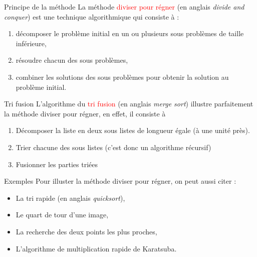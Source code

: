 \documentclass[10pt]{beamer}
\begin{document}
\begin{frame}
	\mframe{\DR}
	\begin{alertblock}{Principe de la méthode}
		La méthode \textcolor{red}{diviser pour régner} (en anglais \textit{divide and conquer})  est une technique algorithmique qui consiste à :        \begin{enumerate}
			\item<2-> décomposer le problème initial en un ou plusieurs sous problèmes de taille inférieure,
			\item<3-> résoudre chacun des sous problèmes,
			\item<4-> combiner les solutions des sous problèmes pour obtenir la solution au problème initial.
		\end{enumerate}
	\end{alertblock}
\end{frame}

\begin{frame}
	\mframe{\DR}
	\begin{alertblock}{Tri fusion}
		L'algorithme du \textcolor{red}{tri fusion} (en anglais \textit{merge sort})  illustre parfaitement la méthode diviser pour régner, en effet, il consiste à
		\begin{enumerate}
			\item<2-> Décomposer la liste en deux sous listes de longueur égale (à une unité près).
			\item<3-> Trier chacune des sous listes (c'est donc un algorithme récursif)
			\item<4-> Fusionner les parties triées
		\end{enumerate}
	\end{alertblock}
\end{frame}


\begin{frame}
	\mframe{\DR}
	\begin{exampleblock}{Exemples}
		Pour illuster la méthode diviser pour régner, on peut aussi citer :
		\begin{itemize}
			\item<2-> La tri rapide (en anglais \textit{quicksort}),
			\item<3-> Le quart de tour d'une image,
			\item<4-> La recherche des deux points les plus proches,
			\item<5-> L'algorithme de multiplication rapide de Karatsuba.
		\end{itemize}
	\end{exampleblock}
\end{frame}
\end{document}
